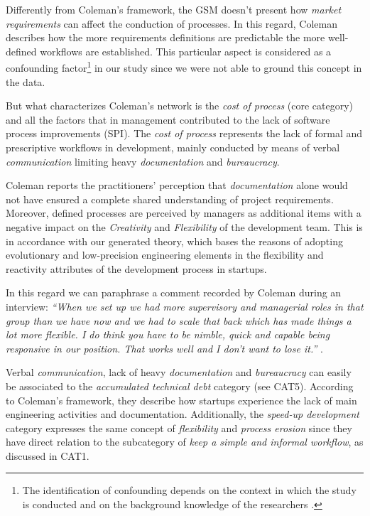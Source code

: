 \documentclass[10pt,journal,letterpaper,compsoc]{IEEEtran}
\begin{document}
Differently from Coleman's framework, the GSM doesn't present how 
\textit{market requirements} can affect the conduction of processes. In this 
regard, Coleman describes how the more requirements definitions are predictable 
the more well-defined workflows are established. This particular aspect is 
considered as a confounding factor\footnote{The identification of confounding 
depends on the context in which the study is conducted and on the background 
knowledge of the researchers \cite{Pearl2011}.}  in our study since we were not 
able to ground this concept in the data.

But what characterizes Coleman's network is the \textit{cost of process} (core 
category) and all the factors that in management contributed to the lack of 
software process improvements (SPI). The \textit{cost of process} represents the 
 lack of formal and prescriptive workflows in development, mainly conducted by 
means of verbal \textit{communication} limiting heavy \textit{documentation} and 
\textit{bureaucracy}. 

Coleman reports the practitioners' perception that \textit{documentation} alone 
would not have ensured a complete shared understanding of project requirements. 
Moreover, defined processes are perceived by managers as additional items with a 
negative impact on the \textit{Creativity} and \textit{Flexibility} of the 
development team. This is in accordance with our generated theory, which bases 
the reasons of adopting evolutionary and low-precision engineering elements in 
the flexibility and reactivity attributes of the development process in 
startups.  

In this regard we can paraphrase a comment recorded by Coleman during an 
interview: \textit{``When we set up we had more supervisory and managerial roles 
in that group than we have now and we had to scale that back which has made 
things a lot more flexible. I do think you have to be nimble, quick and capable 
being responsive in our position. That works well and I don't want to lose 
it.''} \cite{Coleman2007}.

Verbal \textit{communication}, lack of heavy \textit{documentation} and 
\textit{bureaucracy} can easily be associated to the \textit{accumulated 
technical debt} category (see CAT5). According to Coleman's framework, they 
describe how startups experience the lack of main engineering activities and 
documentation. Additionally, the \textit{speed-up development} category 
expresses the same concept of \textit{flexibility} and \textit{process erosion} 
since they have direct relation to the subcategory of \textit{keep a simple and 
informal workflow}, as discussed in CAT1.
\end{document}
